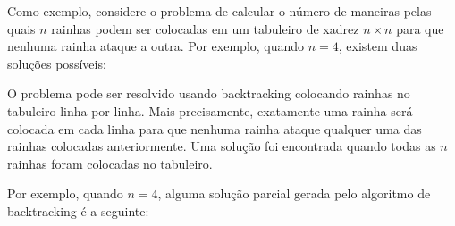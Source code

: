 
Como exemplo, considere o problema de
calcular o número
de maneiras pelas quais $n$ rainhas podem ser colocadas em
um tabuleiro de xadrez $n \times n$ para que
nenhuma rainha ataque a outra.
Por exemplo, quando $n=4$,
existem duas soluções possíveis:

\begin{center}
\end{center}

O problema pode ser resolvido usando backtracking
colocando rainhas no tabuleiro linha por linha.
Mais precisamente, exatamente uma rainha será
colocada em cada linha para que nenhuma rainha ataque
qualquer uma das rainhas colocadas anteriormente.
Uma solução foi encontrada quando todas
as $n$ rainhas foram colocadas no tabuleiro.

Por exemplo, quando $n=4$,
alguma solução parcial gerada pelo
algoritmo de backtracking é a seguinte:

